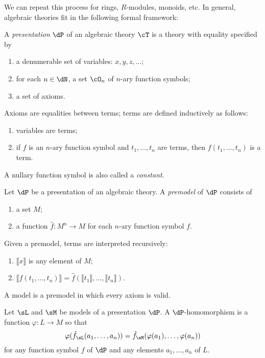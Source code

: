 \documentclass{amsart}
\newcommand{\interp}[1]{\llbracket #1 \rrbracket}
\begin{document}
We can repeat this process for rings, $R$-modules, monoids, etc.
In general, algebraic theories fit in the following formal framework:

\begin{defn}
  A \emph{presentation} $\dP$ of an algebraic theory $\cT$ is a theory with equality specified by
  \begin{enumerate}
  \item a denumerable set of variables: $x, y, z, \ldots$;
  \item for each $n \in \dN$, a set $\cO_{n}$ of $n$-ary function symbols;
  \item a set of axioms.
  \end{enumerate}
  Axioms are equalities between terms; terms are defined inductively as follows:
  \begin{enumerate}
  \item variables are terms;
  \item if $f$ is an $n$-ary function symbol and $t_{1},\ldots,t_{n}$ are terms, then $f(t_{1},\ldots,t_{n})$ is a term.
  \end{enumerate}
  A nullary function symbol is also called a \emph{constant}.
\end{defn}

\begin{defn}
  Let $\dP$ be a presentation of an algebraic theory.
  A \emph{premodel} of $\dP$ consists of
  \begin{enumerate}
  \item a set $M$;
  \item a function $\hat{f} : M^{n} \to M$ for each $n$-ary function symbol $f$.
  \end{enumerate}
\end{defn}

Given a premodel, terms are interpreted recursively:
\begin{enumerate}
\item $\interp{x}$ is any element of $M$;
\item $\interp{f(t_{1},\ldots,t_{n})} = \hat{f}(\interp{t_{1}},\ldots,\interp{t_{n}})$.
\end{enumerate}

A model is a premodel in which every axiom is valid.

\begin{defn}
  Let $\sL$ and $\sM$ be models of a presentation $\dP$.
  A $\dP$-homomorphism is a function $\varphi : L \to M$ so that
  \[
    \varphi(\hat{f}_{\sL}(a_{1},\ldots,a_{n})) = \hat{f}_{\sM}(\varphi(a_{1}),\ldots,\varphi(a_{n}))
  \]
  for any function symbol $f$ of $\dP$ and any elements $a_{1},\ldots,a_{n}$ of $L$.
\end{defn}
\end{document}
